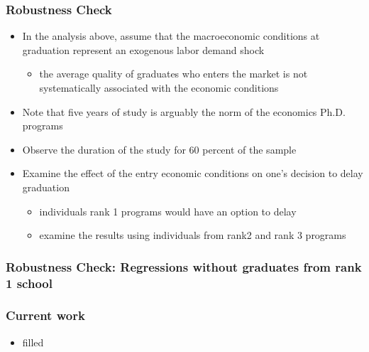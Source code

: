 \documentclass[11pt]{beamer}
\begin{document}
\begin{frame}[label = robustness]
	\frametitle{Robustness Check}
	\begin{itemize}
	\item In the analysis above,  assume that the macroeconomic conditions at graduation represent an exogenous labor demand shock
	\begin{itemize}
		\item  the average quality of graduates who enters the market is not systematically associated with the economic conditions
		\end{itemize}
	\item Note that five years of study is arguably the norm of the economics Ph.D. programs	
	\item Observe the duration of the study for 60 percent of the sample
	\item Examine the effect of the entry economic conditions on one's decision to delay graduation \hyperlink{delay}{}
	\begin{itemize}
		\item individuals rank 1 programs would have an option to delay 
		\item examine the results using individuals from rank2 and rank 3 programs \hyperlink{rank2}{}
	\end{itemize}
\end{itemize}
\end{frame}

{
	\begin{frame}[label = rank2]
		\frametitle{Robustness Check: Regressions without graduates from rank 1 school}
		 
		\hyperlink{robustness}{}
	\end{frame}
}



\begin{frame}
	\frametitle{Current work}
	\begin{itemize}
		\item filled
	\end{itemize}
\end{frame}
\end{document}
